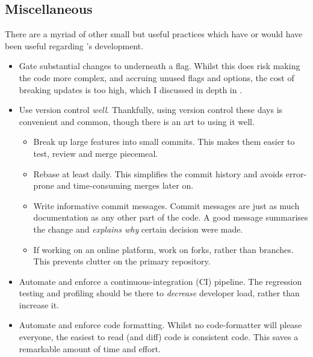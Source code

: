 \subsection{Miscellaneous}

There are a myriad of other small but useful practices which have or would have
been useful regarding 's development.
\begin{itemize}
    \item Gate substantial changes to  underneath a flag. Whilst this
        does risk making the code more complex, and accruing unused flags and
        options, the cost of breaking updates is too high, which I discussed in
        depth in .
    \item Use version control \emph{well}. Thankfully, using version control
        these days is convenient and common, though there is an art to
        using it well.
        \begin{itemize}
            \item Break up large features into small commits. This makes them
                easier to test, review and merge piecemeal.
            \item Rebase at least daily. This simplifies the commit history and
                avoids error-prone and time-consuming merges later on.
            \item Write informative commit messages. Commit messages are just
                as much documentation as any other part of the code. A good
                message summarises the change and \emph{explains why}
                certain decision were made.
            \item If working on an online platform, work on forks, rather than
                branches. This prevents clutter on the primary repository.
        \end{itemize}
    \item Automate and enforce a continuous-integration (CI) pipeline. The
        regression testing and profiling should be there to \emph{decrease}
        developer load, rather than increase  it.
    \item Automate and enforce code formatting. Whilst no code-formatter will
        please everyone, the easiest to read (and diff) code is consistent
        code. This saves a remarkable amount of time and effort.
\end{itemize}

